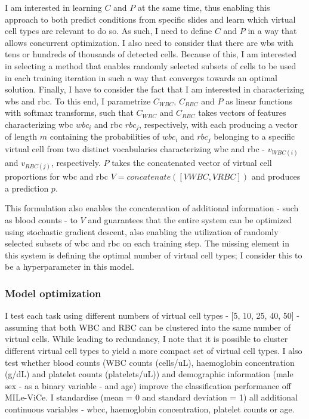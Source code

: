 I am interested in learning $C$ and $P$ at the same time, thus enabling this approach to both predict conditions from specific slides and learn which virtual cell types are relevant to do so. As such, I need to define $C$ and $P$ in a way that allows concurrent optimization. I also need to consider that there are \ac{wbs} with tens or hundreds of thousands of detected  cells. Because of this, I am interested in selecting a method that enables randomly selected subsets of cells to be used in each training iteration in such a way that converges towards an optimal solution.  Finally, I have to consider the fact that I am interested in characterizing \ac{wbs} and \ac{rbc}. To this end, I parametrize $C_{WBC}$, $C_{RBC}$ and $P$ as linear functions with softmax transforms, such that $C_{WBC}$ and $C_{RBC}$ takes vectors of features characterizing \ac{wbc} $wbc_i$ and \ac{rbc} $rbc_j$, respectively, with each producing a vector of length $m$ containing the probabilities of $wbc_i$ and $rbc_j$ belonging to a specific virtual cell from two distinct vocabularies characterizing \ac{wbc} and \ac{rbc} - $v_{WBC(i)}$ and $v_{RBC(j)}$, respectively. $P$ takes the concatenated vector of virtual cell proportions for \ac{wbc} and \ac{rbc} $V=concatenate([VWBC,VRBC])$ and produces a prediction $p$. 

This formulation also enables the concatenation of additional information - such as blood counts - to $V$ and guarantees that the entire system can be optimized using stochastic gradient descent, also enabling the utilization of randomly selected subsets of \ac{wbc} and \ac{rbc} on each training step. The missing element in this system is defining the optimal number of virtual cell types; I consider this to be a hyperparameter in this model.

\subsubsection{Model optimization}

I test each task using different numbers of virtual cell types -  [5, 10, 25, 40, 50] - assuming that both WBC and RBC can be clustered into the same number of virtual cells. While leading to redundancy, I note that it is possible to cluster different virtual cell types to yield a more compact set of virtual cell types. I also test whether blood counts (WBC counts (cells/uL), haemoglobin concentration (g/dL) and platelet counts (platelets/uL)) and demographic information (male sex - as a binary variable - and age) improve the classification performance off MILe-ViCe. I standardise (mean = 0 and standard deviation = 1) all additional continuous variables - \ac{wbcc}, haemoglobin concentration, platelet counts or age.

